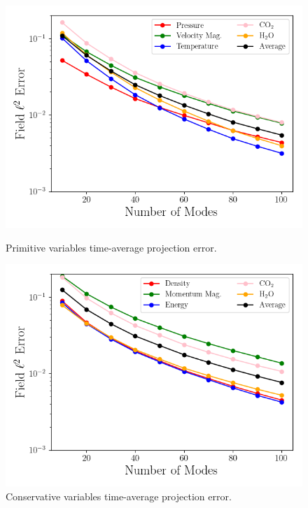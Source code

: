 \begin{figure}
	\begin{minipage}{0.48\linewidth}
		\includegraphics[width=0.99\linewidth,trim={0.5em 0.5em 0.5em 0.5em},clip]{Chapters/HPROMResults/Images/nineElem/projection_error_primitive.png}
		\caption{\label{fig:nineElemProjErrPrim}Primitive variables time-average projection error.}
	\end{minipage} \hspace{0.5em}
	\begin{minipage}{0.48\linewidth}
		\includegraphics[width=0.99\linewidth,trim={0.5em 0.5em 0.5em 0.5em},clip]{Chapters/HPROMResults/Images/nineElem/projection_error_conservative.png}
		\caption{\label{fig:nineElemProjErrCons}Conservative variables time-average projection error.}
	\end{minipage}
\end{figure}


